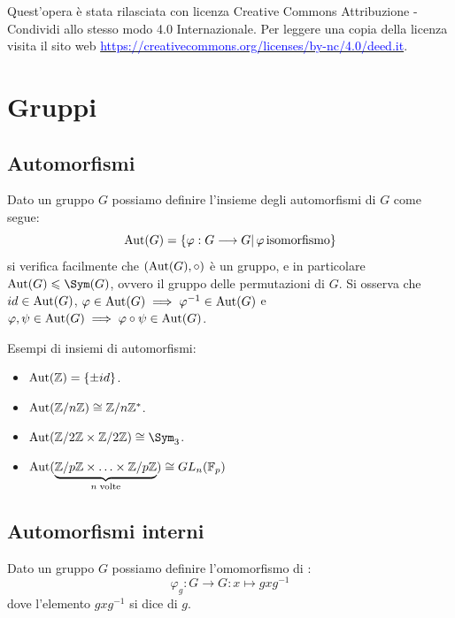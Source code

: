 \documentclass[11pt]{scrartcl}
\begin{document}
Quest'opera è stata rilasciata con licenza Creative Commons Attribuzione - Condividi allo stesso modo 4.0 Internazionale. Per leggere
una copia della licenza visita il sito web \href{http://creativecommons.org/licenses/by-sa/4.0/deed.it}{\textcolor{blue}{https://creativecommons.org/licenses/by-nc/4.0/deed.it}}.\\

\newpage
\section{Gruppi}
\subsection{Automorfismi}
Dato un gruppo $G$ possiamo definire l'insieme degli automorfismi di $G$ come segue:
    \[ \operatorname{Aut}(G) = \{\varphi : G \longrightarrow G |\, \varphi \, \text{isomorfismo}\}
        \]
si verifica facilmente che $(\operatorname{Aut}(G), \circ)$ è un gruppo, e in particolare $\Aut(G) \leqslant \Sym(G)$,
ovvero il gruppo delle permutazioni di $G$. Si osserva che $id \in \operatorname{Aut}(G)$, $\varphi \in \operatorname{Aut}(G) \implies 
\varphi^{-1} \in \operatorname{Aut}(G)$ e $\varphi,\psi \in \operatorname{Aut}(G) \implies \varphi \circ \psi \in \operatorname{Aut}(G)$.

\begin{example}
    Esempi di insiemi di automorfismi:
        \begin{itemize}
            \item $\operatorname{Aut}(\mathbb Z) = \{\pm id\}$.
            \item $\operatorname{Aut}({\mathbb Z}/n{\mathbb Z}) \cong {\mathbb Z}/n{\mathbb Z}^*$.
            \item $\Aut(\Z2 \times \Z2) \cong \Sym_3$.
            \item $\operatorname{Aut}(\underbrace{{\mathbb Z}/p{\mathbb Z} \times \ldots \times {\mathbb Z}/p{\mathbb Z}}_{n \;\text{volte}}) \cong GL_n({\mathbb F}_p)$
        \end{itemize}
\end{example}

\subsection{Automorfismi interni}
\begin{definition}
    Dato un gruppo $G$ possiamo definire l'omomorfismo di :
        \[ \varphi_g : G \longrightarrow G : x \longmapsto gxg^{-1}
            \]
    dove l'elemento $gxg^{-1}$ si dice  di $g$.
\end{definition}
\end{document}
